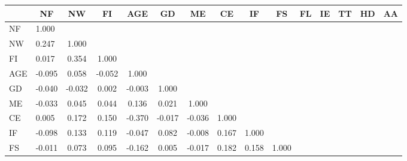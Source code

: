 \documentclass[ukenglish,nottitlepage,thmsb,11pt,letterpaper]{article}
\begin{document}
\begin{sidewaystable}
	\begin{tabular*}{\textwidth}{l @{\extracolsep{\fill}} lccccccccccccc}
	\toprule
	& \multicolumn{1}{c}{NF} & \multicolumn{1}{c}{NW} & \multicolumn{1}{c}{FI} & \multicolumn{1}{c}{AGE} & \multicolumn{1}{c}{GD} & \multicolumn{1}{c}{ME} & \multicolumn{1}{c}{CE} & \multicolumn{1}{c}{IF} & \multicolumn{1}{c}{FS} & \multicolumn{1}{c}{FL} & \multicolumn{1}{c}{IE} & \multicolumn{1}{c}{TT} & \multicolumn{1}{c}{HD} & \multicolumn{1}{c}{AA} \\
	\midrule
	NF           & 1.000        &              &              &              &              &              &              &              &              &              &              &              &              &  \\
	NW           & 0.247        & 1.000        &              &              &              &              &              &              &              &              &              &              &              &  \\
	FI           & 0.017        & 0.354        & 1.000        &              &              &              &              &              &              &              &              &              &              &  \\
	AGE          & -0.095       & 0.058        & -0.052       & 1.000        &              &              &              &              &              &              &              &              &              &  \\
	GD           & -0.040       & -0.032       & 0.002        & -0.003       & 1.000        &              &              &              &              &              &              &              &              &  \\
	ME           & -0.033       & 0.045        & 0.044        & 0.136        & 0.021        & 1.000        &              &              &              &              &              &              &              &  \\
	CE           & 0.005        & 0.172        & 0.150        & -0.370       & -0.017       & -0.036       & 1.000        &              &              &              &              &              &              &  \\
	IF           & -0.098       & 0.133        & 0.119        & -0.047       & 0.082        & -0.008       & 0.167        & 1.000        &              &              &              &              &              &  \\
	FS           & -0.011       & 0.073        & 0.095        & -0.162       & 0.005        & -0.017       & 0.182        & 0.158        & 1.000        &              &              &              &              &  \\

\end{tabular*}
\end{sidewaystable}
\end{document}
